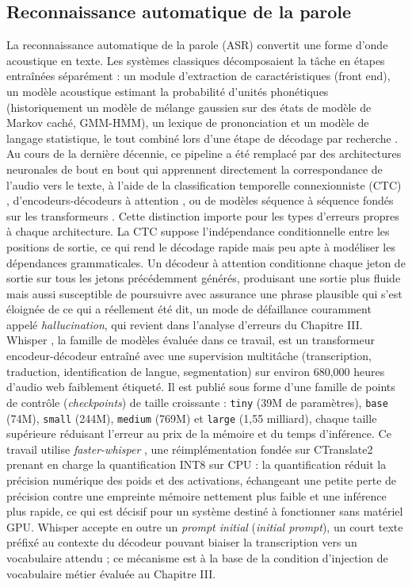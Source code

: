\documentclass[12pt]{report}
\begin{document}
\subsection{Reconnaissance automatique de la parole}
La reconnaissance automatique de la parole (ASR) convertit une forme d'onde acoustique en texte. Les systèmes classiques décomposaient la tâche en étapes entraînées séparément : un module d'extraction de caractéristiques (front end), un modèle acoustique estimant la probabilité d'unités phonétiques (historiquement un modèle de mélange gaussien sur des états de modèle de Markov caché, GMM-HMM), un lexique de prononciation et un modèle de langage statistique, le tout combiné lors d'une étape de décodage par recherche \cite{li2014overview}. Au cours de la dernière décennie, ce pipeline a été remplacé par des architectures neuronales de bout en bout qui apprennent directement la correspondance de l'audio vers le texte, à l'aide de la classification temporelle connexionniste (CTC) \cite{graves2012sequence}, d'encodeurs-décodeurs à attention \cite{bahdanau2016end}, ou de modèles séquence à séquence fondés sur les transformeurs \cite{vaswani2017attention}.
Cette distinction importe pour les types d'erreurs propres à chaque architecture. La CTC suppose l'indépendance conditionnelle entre les positions de sortie, ce qui rend le décodage rapide mais peu apte à modéliser les dépendances grammaticales. Un décodeur à attention conditionne chaque jeton de sortie sur tous les jetons précédemment générés, produisant une sortie plus fluide mais aussi susceptible de poursuivre avec assurance une phrase plausible qui s'est éloignée de ce qui a réellement été dit, un mode de défaillance couramment appelé \textit{hallucination}, qui revient dans l'analyse d'erreurs du Chapitre III.
Whisper \cite{radford2023robust}, la famille de modèles évaluée dans ce travail, est un transformeur encodeur-décodeur entraîné avec une supervision multitâche (transcription, traduction, identification de langue, segmentation) sur environ 680{,}000 heures d'audio web faiblement étiqueté. Il est publié sous forme d'une famille de points de contrôle (\textit{checkpoints}) de taille croissante : \texttt{tiny} (39M de paramètres), \texttt{base} (74M), \texttt{small} (244M), \texttt{medium} (769M) et \texttt{large} (1,55 milliard), chaque taille supérieure réduisant l'erreur au prix de la mémoire et du temps d'inférence. Ce travail utilise \textit{faster-whisper} \cite{fasterwhisper2023}, une réimplémentation fondée sur CTranslate2 prenant en charge la quantification INT8 sur CPU : la quantification réduit la précision numérique des poids et des activations, échangeant une petite perte de précision contre une empreinte mémoire nettement plus faible et une inférence plus rapide, ce qui est décisif pour un système destiné à fonctionner sans matériel GPU. Whisper accepte en outre un \textit{prompt initial} (\textit{initial prompt}), un court texte préfixé au contexte du décodeur pouvant biaiser la transcription vers un vocabulaire attendu ; ce mécanisme est à la base de la condition d'injection de vocabulaire métier évaluée au Chapitre III.
\end{document}
